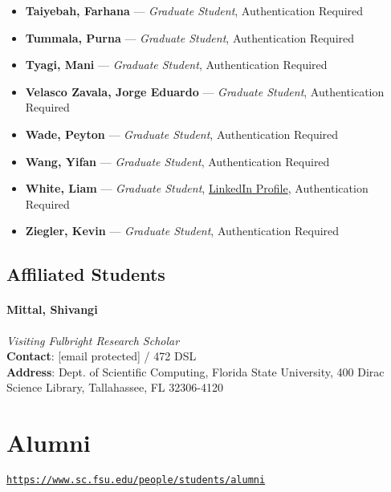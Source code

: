 \documentclass[12pt,a4paper]{article}
\begin{document}
\begin{itemize}
    \item \textbf{Taiyebah, Farhana} --- \textit{Graduate Student}, Authentication Required
    \item \textbf{Tummala, Purna} --- \textit{Graduate Student}, Authentication Required
    \item \textbf{Tyagi, Mani} --- \textit{Graduate Student}, Authentication Required
    \item \textbf{Velasco Zavala, Jorge Eduardo} --- \textit{Graduate Student}, Authentication Required
    \item \textbf{Wade, Peyton} --- \textit{Graduate Student}, Authentication Required
    \item \textbf{Wang, Yifan} --- \textit{Graduate Student}, Authentication Required
    \item \textbf{White, Liam} --- \textit{Graduate Student}, \href{https://www.linkedin.com/in/liam-white-090906154/}{LinkedIn Profile}, Authentication Required
    \item \textbf{Ziegler, Kevin} --- \textit{Graduate Student}, Authentication Required
\end{itemize}

\subsection{Affiliated Students}
\paragraph{Mittal, Shivangi}
\textit{Visiting Fulbright Research Scholar}\\
\textbf{Contact}: [email protected] / 472 DSL\\
\textbf{Address}: Dept. of Scientific Computing, Florida State University, 400 Dirac Science Library, Tallahassee, FL 32306-4120

\section{Alumni}
\texttt{\url{https://www.sc.fsu.edu/people/students/alumni}}
\end{document}
